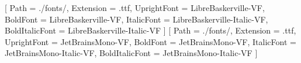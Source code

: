 %

\usepackage{graphicx}
\usepackage{xcolor}

\usepackage{fontspec}
\setmainfont{LibreBaskerville-VF}[
  Path = ./fonts/,
  Extension = .ttf,
  UprightFont    = LibreBaskerville-VF,
  BoldFont       = LibreBaskerville-VF,
  ItalicFont     = LibreBaskerville-Italic-VF,
  BoldItalicFont = LibreBaskerville-Italic-VF
]
\setmonofont{JetBrainsMono-VF}[
  Path = ./fonts/,
  Extension = .ttf,
  UprightFont    = JetBrainsMono-VF,
  BoldFont       = JetBrainsMono-VF,
  ItalicFont     = JetBrainsMono-Italic-VF,
  BoldItalicFont = JetBrainsMono-Italic-VF
]


\let\oldtexttt\texttt
\renewcommand{\texttt}[1]{\colorbox{codebg}{\oldtexttt{#1}}}

\usepackage{listings}
